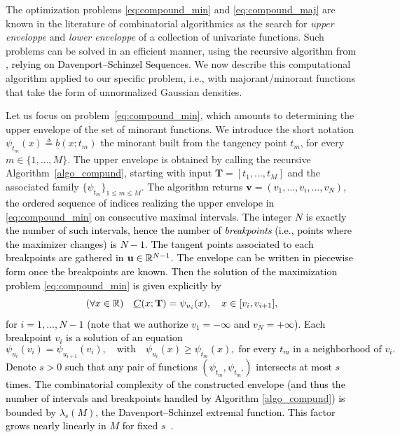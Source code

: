 \documentclass[review]{elsarticle}
\newcommand{\cblue}{\textcolor{black}}
\def\u{{\bf u}}
\def\T{{\bf T}}
\begin{document}
The optimization problems \eqref{eq:compound_min} and \eqref{eq:compound_maj} are known in the literature of combinatorial algorithmics as the search for \emph{upper enveloppe} and \emph{lower enveloppe} of a collection of univariate functions. Such problems can be solved in an efficient manner, using \cblue{the recursive algorithm from \cite{AGARWAL20001}, relying on Davenport–Schinzel Sequences}. We now describe this computational algorithm applied to our specific problem, i.e., with majorant/minorant functions that take the form of unnormalized Gaussian densities. 

Let us focus on problem~\eqref{eq:compound_min}, which amounts to determining the upper envelope of the set of minorant functions. We introduce the short notation $\psi_{t_m}(x) \triangleq \underline{b}(x; t_m)$ the minorant built from the tangency point $t_m$, for every $m \in \{1, \ldots, M\}$. %
The upper envelope is obtained by calling the recursive Algorithm~\ref{algo_compund}, starting with input $\mathbf{T} = [t_1, \dots,  t_M]$ and the associated family $\{\psi_{t_m}\}_{1 \leq m \leq M}$. \cblue{The algorithm returns $\mathbf{v} = (v_1, \dots, v_i, \ldots, v_{N})$, the ordered sequence of indices realizing the upper envelope in \eqref{eq:compound_min} on consecutive maximal intervals. The integer \(N\) is exactly the number of such intervals, hence the number of \emph{breakpoints} (i.e., points where the maximizer changes) is $N-1$. The tangent points associated to each breakpoints are gathered in $\u \in \mathbb{R}^{N-1}$. The envelope can be written in piecewise form once the breakpoints are known. Then the solution of the maximization problem \eqref{eq:compound_min} is given explicitly by
\[
(\forall x \in \mathbb{R}) \quad \underline{C}(x;\T) = \psi_{u_i}(x), \quad x \in [v_{i}, v_{i+1}],
\]
for \(i=1,\dots,N-1\) (note that we authorize $v_1 = - \infty$ and $v_{N} = + \infty$). Each breakpoint \(v_i\) is a solution of an equation
\[
\psi_{u_i}(v_i) = \psi_{u_{i+1}}(v_i), \quad \text{with} \quad \psi_{u_i}(x) \ge \psi_{t_m}(x),\;\text{for every $t_m$ in a neighborhood of } v_i.
\]
Denote $s>0$ such that any pair of functions $(\psi_{t_m},\psi_{t_m'})$
intersects at most 
$s$ times. The combinatorial complexity of the constructed envelope (and thus the number of intervals and breakpoints handled by Algorithm \ref{algo_compund}) is bounded by 
$\lambda_s(M)$, the Davenport–Schinzel extremal function. This factor grows nearly linearly in $M$ for fixed $s$~\cite{AGARWAL20001}.
} %
\end{document}
